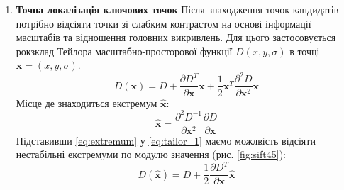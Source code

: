 \begin{enumerate}
    \item \textbf{Точна локалізація ключових точок}
          Після знаходження точок-кандидатів потрібно відсіяти точки зі слабким контрастом на основі
          інформації масштабів та відношення головних викривлень. Для цього застосовується рокзклад
          Тейлора масштабно-просторової функції $D(x,y,\sigma)$ в точці $\textbf{x} = (x,y,\sigma)$.
          \begin{equation}
              D(\textbf{x}) = D + \frac{\partial D^T }{\partial \textbf{x} }\textbf{x} +
              \frac{1}{2}\textbf{x}^T\frac{\partial^2 D}{\partial \textbf{x}^2}\textbf{x}
              \label{eq:tailor_1}
          \end{equation}
          Місце де знаходиться екстремум $\widehat{\textbf{x}}$:
          \begin{equation}
              \widehat{\textbf{x}} = \frac{\partial^2 D^{-1} }{\partial
                  \textbf{x}^2}\frac{\partial D }{\partial \textbf{x}}
              \label{eq:extremum}
          \end{equation}
          Підставивши \ref{eq:extremum} у  \ref{eq:tailor_1} маємо можлвість відсіяти нестабільні
          екстремуми по модулю значення (рис. \ref{fig:sift45}):
          \begin{equation}
              D(\widehat{\textbf{x}}) = D + \frac{1}{2}\frac{\partial D^{T} }{\partial \textbf{x}}\widehat{\textbf{x}}
          \end{equation}


\end{enumerate}

